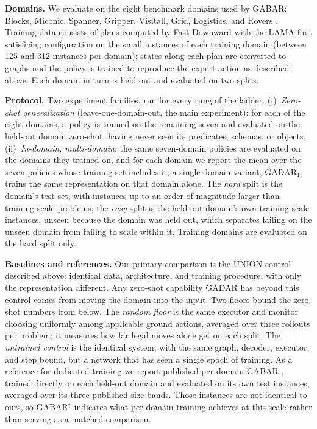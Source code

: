 \documentclass{article} %
\newcommand{\gadar}{GADAR}                 %
\newcommand{\union}{UNION}                 %
\begin{document}
\textbf{Domains.} We evaluate on the eight benchmark domains used by GABAR:
Blocks, Miconic, Spanner, Gripper, Visitall, Grid, Logistics, and
Rovers \citep{gabar, pddl-generators}. Training data consists of plans
computed by Fast Downward with the LAMA-first satisficing configuration
\citep{fast_downward} on the small instances of each training domain
(between 125 and 312 instances per domain); states along each plan are
converted to graphs and the policy is trained to reproduce the expert
action as described above. Each domain in turn is held out and evaluated
on two splits.

\textbf{Protocol.} Two experiment families, run for every rung of the
ladder. (i)~\emph{Zero-shot generalization} (leave-one-domain-out, the
main experiment): for each of the eight domains, a policy is trained on the remaining seven and evaluated
on the held-out domain zero-shot, having never seen its predicates,
schemas, or objects. (ii)~\emph{In-domain, multi-domain}: the same
seven-domain policies
are evaluated on the domains they trained on, and for each domain we report
the mean over the seven policies whose training set includes it; a
single-domain variant, \gadar{}$_1$, trains the same representation on that
domain alone. The \emph{hard} split is the domain's test
set, with instances up to an order of magnitude larger than training-scale
problems; the \emph{easy} split is the held-out domain's own
training-scale instances, unseen because the domain was held out, which
separates failing on the unseen domain from failing to scale within it.
Training domains are evaluated on the hard split only.

\textbf{Baselines and references.} Our primary comparison is the \union{}
control described above: identical data, architecture, and training
procedure, with only the representation different. Any zero-shot
capability \gadar{} has beyond this control comes from moving the domain
into the input. Two floors bound the zero-shot numbers from below. The
\emph{random floor} is the same executor and monitor choosing uniformly
among applicable ground actions, averaged over three rollouts per problem;
it measures how far legal moves alone get on each split. The
\emph{untrained control} is the identical system, with the same graph,
decoder, executor, and step bound, but a network that has seen a single
epoch of training. As a reference for dedicated training we report
published per-domain GABAR \citep{gabar}, trained directly on each
held-out domain and evaluated on its own test instances, averaged over its
three published size bands. Those instances are not identical to ours, so
GABAR$^\dagger$ indicates what per-domain training achieves at this scale
rather than serving as a matched comparison.
\end{document}
